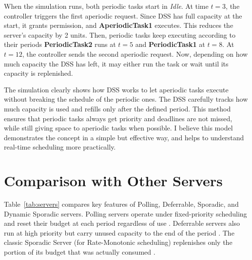 \documentclass[conference]{IEEEtran}
\begin{document}
When the simulation runs, both periodic tasks start in \textit{Idle}. At time $t = 3$, the controller triggers the first aperiodic request. Since DSS has full capacity at the start, it grants permission, and \textbf{AperiodicTask1} executes. This reduces the server's capacity by 2 units. Then, periodic tasks keep executing according to their periods \textbf{PeriodicTask2} runs at $t = 5$ and \textbf{PeriodicTask1} at $t = 8$. At $t = 12$, the controller sends the second aperiodic request. Now, depending on how much capacity the DSS has left, it may either run the task or wait until its capacity is replenished.

The simulation clearly shows how DSS works to let aperiodic tasks execute without breaking the schedule of the periodic ones. The DSS carefully tracks how much capacity is used and refills only after the defined period. This method ensures that periodic tasks always get priority and deadlines are not missed, while still giving space to aperiodic tasks when possible. I believe this model demonstrates the concept in a simple but effective way, and helps to understand real-time scheduling more practically.

\section{Comparison with Other Servers}
Table~\ref{tab:servers} compares key features of Polling, Deferrable, Sporadic, and Dynamic Sporadic servers.  Polling servers operate under fixed-priority scheduling and reset their budget at each period regardless of use \cite{sprunt1989aperiodic}.  Deferrable servers also run at high priority but carry unused capacity to the end of the period \cite{buttazzo2011hard}.  The classic Sporadic Server (for Rate-Monotonic scheduling) replenishes only the portion of its budget that was actually consumed \cite{sprunt1989aperiodic}.  
\end{document}
